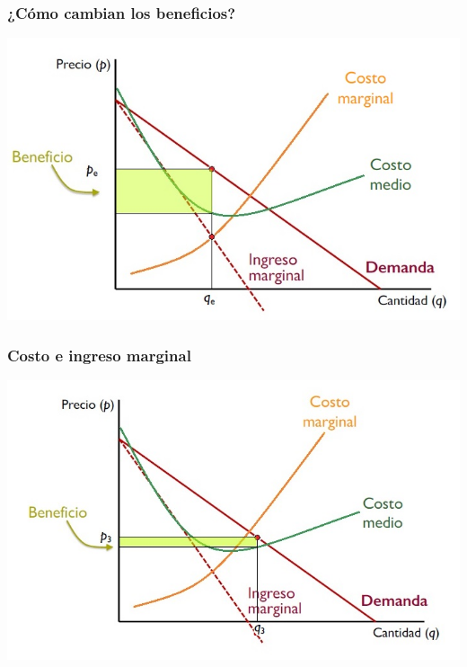 \documentclass{beamer}
\begin{document}
\begin{frame}
\frametitle{¿Cómo cambian los beneficios?}
\includegraphics[scale=0.6]{Figures/Tema_06.35_beneficios2.jpg}
\end{frame}

\begin{frame}
\frametitle{ Costo e ingreso marginal}
\includegraphics[scale=0.6]{Figures/Tema_06.36_beneficios3.jpg}
\end{frame}
\end{document}
